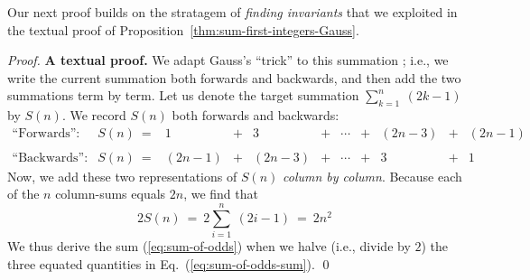 
\medskip

Our next proof builds on the stratagem of {\em finding invariants} that we exploited in the textual proof of Proposition~\ref{thm:sum-first-integers-Gauss}.

\begin{proof}
{\bf A textual proof.}
We adapt Gauss's ``trick'' to this summation ; i.e., we write the current summation both forwards and backwards, and then add the two summations term by term.  Let us denote the target summation $\sum_{k=1}^n \ (2k-1)$ by $S(n)$.  We record $S(n)$ both forwards and backwards:
\begin{equation}
\label{eq:add-odds}
\begin{array}{llccccccccc}
\mbox{``Forwards'':} &
S(n) \ = 
& 1 & + & 3 & + & \cdots & + & (2n-3) & + & (2n-1) \\
 & & & & & & & & & &  \\
\mbox{``Backwards'':} &
S(n) \ =
& (2n-1) & + & (2n-3) & + & \cdots & + & 3 & + & 1
\end{array}
\end{equation}
Now, we add these two representations of $S(n)$ {\em column by column}.  Because each of the $n$ column-sums equals $2n$, we find that
\begin{equation}
\label{eq:sum-of-odds-sum}
2 S(n) \ = \ 2 \sum_{i=1}^n \ (2i-1) \ = \ 2n^2
\end{equation}
We thus derive the sum (\ref{eq:sum-of-odds}) when we halve (i.e., divide by $2$) the three
equated quantities in Eq.~(\ref{eq:sum-of-odds-sum}).  \qed
\end{proof}

\medskip

